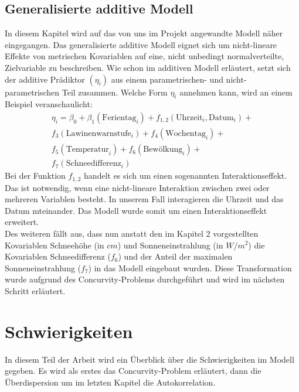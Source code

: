 \documentclass[12pt]{scrreprt}
\begin{document}
\subsection{Generalisierte additive Modell}
In diesem Kapitel wird auf das von uns im Projekt angewandte Modell näher eingegangen. Das generalisierte additive Modell eignet sich um nicht-lineare Effekte von metrischen Kovariablen auf eine, nicht unbedingt normalverteilte, Zielvariable zu beschreiben. Wie schon im additiven Modell erläutert, setzt sich der additive Prädiktor $(\eta_{i})$ aus einem parametrischen- und nicht-parametrischen Teil zusammen. Welche Form $\eta_{i}$ annehmen kann, wird an einem Beispiel veranschaulicht:
\begin{align}
\eta_{i}=\beta_{0}+\beta_{1}(\text{Ferientag}_{i})+f_{1,2}(\text{Uhrzeit}_{i},\text{Datum}_{i})+ \nonumber \\
f_{3}(\text{Lawinenwarnstufe}_{i})+f_{4}(\text{Wochentag}_{i})+ \nonumber \\
f_{5}(\text{Temperatur}_{i})+f_{6}(\text{Bewölkung}_{i})+  \nonumber \\
f_{7}(\text{Schneedifferenz}_{i})
\end{align}
Bei der Funktion $f_{1,2}$ handelt es sich um einen sogenannten Interaktionseffekt. Das ist notwendig, wenn eine nicht-lineare Interaktion zwischen zwei oder mehreren Variablen besteht. In unserem Fall interagieren die Uhrzeit und das Datum mteinander. Das Modell wurde somit um einen Interaktionseffekt erweitert. \\
\noindent Des weiteren fällt aus, dass nun anstatt den im Kapitel 2 vorgestellten Kovariablen Schneehöhe (in $cm$) und Sonneneinstrahlung (in $W/m^2$) die Kovariablen Schneedifferenz ($f_{6}$) und der Anteil der maximalen Sonneneinstrahlung ($f_{7}$) in das Modell eingebaut wurden. Diese Transformation wurde aufgrund des Concurvity-Problems durchgeführt und wird im nächsten Schritt erläutert. 
\section{Schwierigkeiten}
In diesem Teil der Arbeit wird ein Überblick über die Schwierigkeiten im Modell gegeben. Es wird als erstes das Concurvity-Problem erläutert, dann die Überdispersion um im letzten Kapitel die Autokorrelation.
\end{document}
